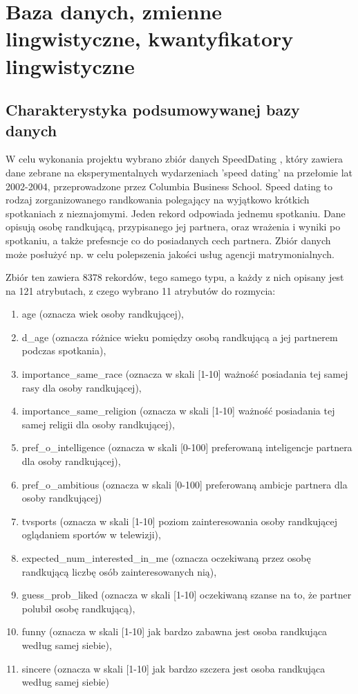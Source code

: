 \documentclass{classrep}
\begin{document}
\section{Baza danych, zmienne lingwistyczne, kwantyfikatory lingwistyczne}

\subsection{Charakterystyka podsumowywanej bazy danych}

W celu wykonania projektu wybrano zbiór danych SpeedDating \cite{database}, który zawiera dane zebrane na eksperymentalnych wydarzeniach 'speed dating' na przełomie lat 2002-2004, przeprowadzone przez Columbia Business School. 
Speed dating to rodzaj zorganizowanego randkowania polegający na wyjątkowo krótkich spotkaniach z nieznajomymi. Jeden rekord odpowiada jednemu spotkaniu. Dane opisują osobę randkującą, przypisanego jej partnera, oraz wrażenia i wyniki po spotkaniu, a także prefesncje co do posiadanych cech partnera. 
Zbiór danych może posłużyć np. w celu polepszenia jakości usług agencji matrymonialnych.

Zbiór ten zawiera 8378 rekordów, tego samego typu, a każdy z nich opisany jest na 121 atrybutach, z czego wybrano 11 atrybutów do rozmycia:
\begin{enumerate}
  \item age (oznacza wiek osoby randkującej),
  \item d\_age (oznacza różnice wieku pomiędzy osobą randkującą a jej partnerem podczas spotkania),
  \item importance\_same\_race (oznacza w skali [1-10] ważność posiadania tej samej rasy dla osoby randkującej), 
  \item importance\_same\_religion (oznacza w skali [1-10] ważność posiadania tej samej religii dla osoby randkującej), 
  \item pref\_o\_intelligence (oznacza w skali [0-100] preferowaną inteligencje partnera dla osoby randkującej),
  \item pref\_o\_ambitious (oznacza w skali [0-100] preferowaną ambicje partnera dla osoby randkującej)
  \item tvsports (oznacza w skali [1-10] poziom zainteresowania osoby randkującej oglądaniem sportów w telewizji),
  \item expected\_num\_interested\_in\_me (oznacza oczekiwaną przez osobę randkującą liczbę osób zainteresowanych nią),
  \item guess\_prob\_liked (oznacza w skali [1-10] oczekiwaną szanse na to, że partner polubił osobę randkującą),
  \item funny (oznacza w skali [1-10] jak bardzo zabawna jest osoba randkująca według samej siebie),
  \item sincere (oznacza w skali [1-10] jak bardzo szczera jest osoba randkująca według samej siebie)
\end{enumerate}
\end{document}
